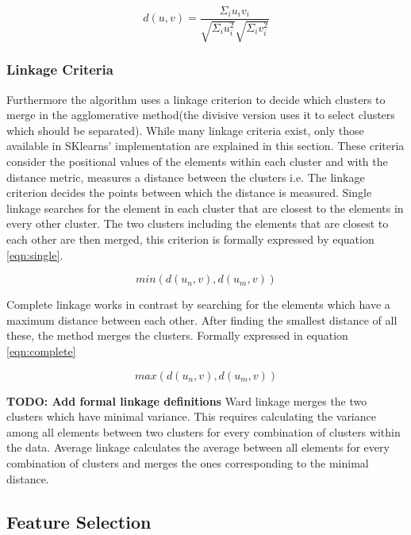 \begin{equation}
\label{eqn:cosine}
d(u, v) = \frac{\Sigma_i u_iv_i}{\sqrt{\Sigma_i u_i^2}\sqrt{\Sigma_i v_i^2}}
\end{equation}

\subsubsection{Linkage Criteria}

Furthermore the algorithm uses a linkage criterion to decide which clusters to merge in the agglomerative method(the divisive version uses it to select clusters which should be separated). While many linkage criteria exist, only those available in SKlearns' implementation are explained in this section\cite{scikit}. These criteria consider the positional values of the elements within each cluster and with the distance metric, measures a distance between the clusters i.e. The linkage criterion decides the points between which the distance is measured. Single linkage searches for the element in each cluster that are closest to the elements in every other cluster. The two clusters including the elements that are closest to each other are then merged, this criterion is formally expressed by equation \ref{eqn:single}.

\begin{equation}
\label{eqn:single}
min(d(u_n, v), d(u_m, v))
\end{equation}

Complete linkage works in contrast by searching for the elements which have a maximum distance between each other. After finding the smallest distance of all these, the method merges the clusters. Formally expressed in equation \ref{eqn:complete}

\begin{equation}
\label{eqn:complete}
max(d(u_n, v), d(u_m, v))
\end{equation}

\textbf{TODO: Add formal linkage definitions}
Ward linkage merges the two clusters which have minimal variance. This requires calculating the variance among all elements between two clusters for every combination of clusters within the data. Average linkage calculates the average between all elements for every combination of clusters and merges the ones corresponding to the minimal distance.

\subsection{Feature Selection}

